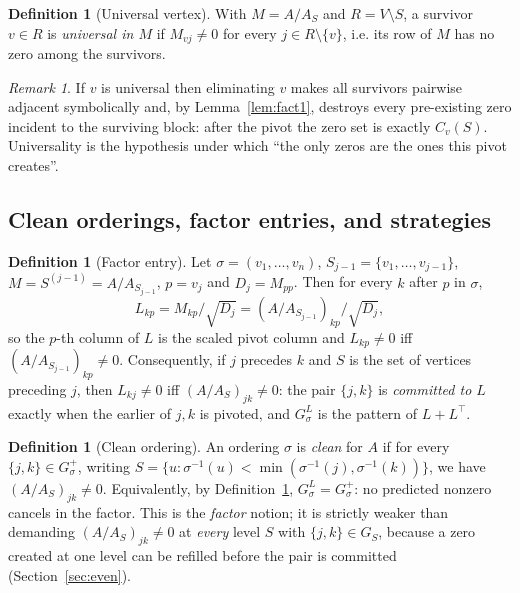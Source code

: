 \documentclass[11pt]{article}
\theoremstyle{plain}
\theoremstyle{definition}
\newtheorem{definition}[theorem]{Definition}
\theoremstyle{remark}
\newtheorem{remark}[theorem]{Remark}
\begin{document}
\begin{aiblock}
\begin{definition}[Universal vertex]\label{def:universal}
With $M=A/A_S$ and $R=V\setminus S$, a survivor $v\in R$ is \emph{universal in $M$} if $M_{vj}\neq0$
for every $j\in R\setminus\{v\}$, i.e. its row of $M$ has no zero among the survivors.
\end{definition}

\begin{remark}\label{rem:universal}
If $v$ is universal then eliminating $v$ makes all survivors pairwise adjacent symbolically and, by
Lemma~\ref{lem:fact1}, destroys every pre-existing zero incident to the surviving block: after the
pivot the zero set is exactly $C_v(S)$. Universality is the hypothesis under which ``the only zeros
are the ones this pivot creates''.
\end{remark}

\subsection{Clean orderings, factor entries, and strategies}

\begin{definition}[Factor entry]\label{def:Llink}
Let $\sigma=(v_1,\dots,v_n)$, $S_{j-1}=\{v_1,\dots,v_{j-1}\}$, $M=S^{(j-1)}=A/A_{S_{j-1}}$, $p=v_j$
and $D_j=M_{pp}$. Then for every $k$ after $p$ in $\sigma$,
\[
L_{kp}=M_{kp}/\sqrt{D_j}=(A/A_{S_{j-1}})_{kp}/\sqrt{D_j},
\]
so the $p$-th column of $L$ is the scaled pivot column and $L_{kp}\neq0$ iff
$(A/A_{S_{j-1}})_{kp}\neq0$. Consequently, if $j$ precedes $k$ and $S$ is the set of vertices
preceding $j$, then $L_{kj}\neq0$ iff $(A/A_S)_{jk}\neq0$: the pair $\{j,k\}$ is \emph{committed to
$L$} exactly when the earlier of $j,k$ is pivoted, and $G^L_\sigma$ is the pattern of $L+L^\top$.
\end{definition}

\begin{definition}[Clean ordering]\label{def:clean}
An ordering $\sigma$ is \emph{clean} for $A$ if for every $\{j,k\}\in G^+_\sigma$, writing
$S=\{u:\sigma^{-1}(u)<\min(\sigma^{-1}(j),\sigma^{-1}(k))\}$, we have $(A/A_S)_{jk}\neq0$.
Equivalently, by Definition~\ref{def:Llink}, $G^L_\sigma=G^+_\sigma$: no predicted nonzero cancels in
the factor. This is the \emph{factor} notion; it is strictly weaker than demanding
$(A/A_S)_{jk}\neq0$ at \emph{every} level $S$ with $\{j,k\}\in G_S$, because a zero created at one
level can be refilled before the pair is committed (Section~\ref{sec:even}).
\end{definition}


\end{aiblock}
\end{document}
